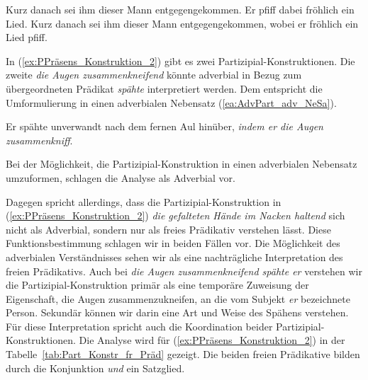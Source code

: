 \ea \label{ea:frPrädPart_HS_NeSa}
\ea \label{ea:frPrädPart_HS} Kurz danach sei ihm dieser Mann entgegengekommen. Er pfiff dabei fröhlich ein Lied.
\ex \label{ex:frPrädPart_NeSa} Kurz danach sei ihm dieser Mann entgegengekommen, wobei er fröhlich ein Lied pfiff.
\z 
\z 

In (\ref{ex:PPräsens_Konstruktion_2}) gibt es zwei Partizipial-Konstruktionen. Die zweite \textit{die Augen zusammenkneifend} könnte adverbial in Bezug zum übergeordneten Prädikat \textit{spähte} interpretiert werden. Dem entspricht die Umformulierung in einen adverbialen Nebensatz (\ref{ea:AdvPart_adv_NeSa}).

\ea \label{ea:AdvPart_adv_NeSa} Er spähte unverwandt nach dem fernen Aul hinüber, \textit{indem er die Augen zusammenkniff}.
\z 

Bei der Möglichkeit, die Partizipial-Konstruktion in einen adverbialen Nebensatz umzuformen, schlagen \ua \citet[585]{HelbigBuscha} die Analyse als Adverbial vor. 

Dagegen spricht allerdings, dass die Partizipial-Konstruktion in (\ref{ex:PPräsens_Konstruktion_2}) \textit{die gefalteten Hände im Nacken haltend} sich nicht als Adverbial, sondern nur als freies Prädikativ verstehen lässt. Diese Funktionsbestimmung schlagen wir in beiden Fällen vor. Die Möglichkeit des adverbialen Verständnisses sehen wir als eine nachträgliche Interpretation des freien Prädikativs. Auch bei \textit{die Augen zusammenkneifend spähte er} verstehen wir die Partizipial-Konstruktion primär als eine temporäre Zuweisung der Eigenschaft, die Augen zusammenzukneifen, an die vom Subjekt \textit{er} bezeichnete Person. Sekundär können wir darin eine Art und Weise des Spähens verstehen. Für diese Interpretation spricht auch die Koordination beider Partizipial-Konstruktionen. Die Analyse wird für (\ref{ex:PPräsens_Konstruktion_2}) in der Tabelle~\ref{tab:Part_Konstr_fr_Präd} gezeigt. Die beiden freien Prädikative bilden durch die Konjunktion \textit{und} ein Satzglied.


